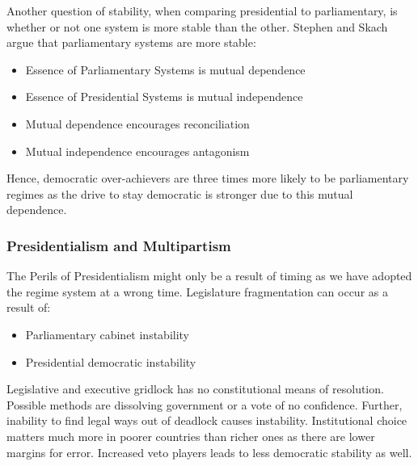 \documentclass[12pt, letterpaper]{article}
\begin{document}
Another question of stability, when comparing presidential to parliamentary, is whether or not one system is more stable than the other. Stephen and Skach argue that parliamentary systems are more stable:
\begin{itemize}
	\item Essence of Parliamentary Systems is mutual dependence
	\item Essence of Presidential Systems is mutual independence
	\item Mutual dependence encourages reconciliation
	\item Mutual independence encourages antagonism
\end{itemize}
Hence, democratic over-achievers are three times more likely to be parliamentary regimes as the drive to stay democratic is stronger due to this mutual dependence.

\subsubsection{Presidentialism and Multipartism}
The Perils of Presidentialism might only be a result of timing as we have adopted the regime system at a wrong time. Legislature fragmentation can occur as a result of:
\begin{itemize}
	\item Parliamentary cabinet instability
	\item Presidential democratic instability
\end{itemize}
Legislative and executive gridlock has no constitutional means of resolution. Possible methods are dissolving government or a vote of no confidence.
Further, inability to find legal ways out of deadlock causes instability. Institutional choice matters much more in poorer countries than richer ones as there are lower margins for error.
Increased veto players leads to less democratic stability as well.
\end{document}
